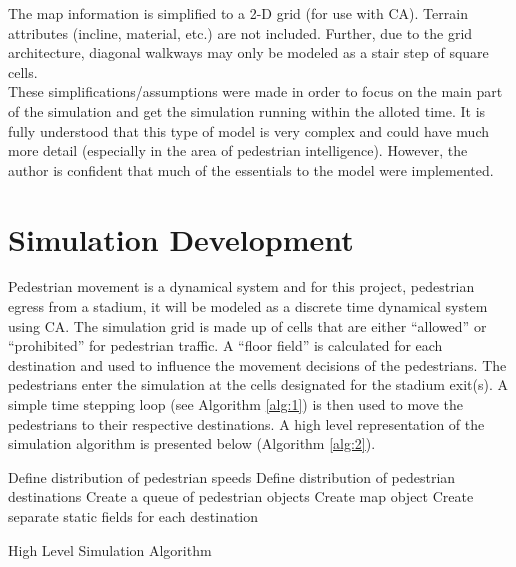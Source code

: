 \documentclass[paper=a4, fontsize=11pt]{scrartcl}
\numberwithin{equation}{section}		%
\numberwithin{figure}{section}			%
\numberwithin{table}{section}		    %
\begin{document}
\noindent
The map information is simplified to a 2-D grid (for use with CA). Terrain attributes (incline, 
material, etc.) are not included. Further, due to the grid architecture, diagonal walkways may only 
be modeled as a stair step of square cells.\\

\noindent
These simplifications/assumptions were made in order to focus on the main part of the simulation 
and get the simulation running within the alloted time. It is fully understood that this type of 
model is very complex and could have much more detail (especially in the area of pedestrian 
intelligence). However, the author is confident that much of the essentials to the model were 
implemented.

\section{Simulation Development} \label{sec:simdev}
Pedestrian movement is a dynamical system and for this project, pedestrian egress from a 
stadium, it will be modeled as a discrete time dynamical system using CA. The simulation grid 
is made up of cells that are either ``allowed'' or ``prohibited'' for pedestrian traffic. A 
``floor field'' \cite{varas2007cellular} is calculated for each destination and used to 
influence the movement decisions of the pedestrians. The pedestrians enter the simulation at 
the cells designated for the stadium exit(s). A simple time stepping loop (see Algorithm 
\ref{alg:1}) is then used to move the pedestrians to their respective destinations. A high 
level representation of the simulation algorithm is presented below (Algorithm \ref{alg:2}).

\begin{algorithm}[h]
\DontPrintSemicolon
{}
Define distribution of pedestrian speeds\;
Define distribution of pedestrian destinations\;
Create a queue of pedestrian objects\;
Create map object\;
Create separate static fields for each destination\;
\caption{High Level Simulation Algorithm \label{alg:2}}
\end{algorithm}
\end{document}
